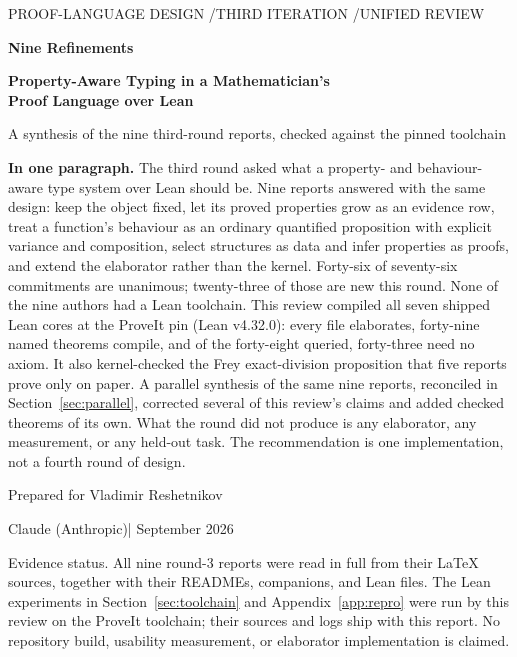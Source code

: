 \documentclass[11pt,a4paper]{article}
\theoremstyle{definition}
\begin{document}
\begin{titlepage}
\vspace*{8mm}
{\sffamily\small\color{muted}PROOF-LANGUAGE DESIGN \quad/\quad THIRD ITERATION \quad/\quad UNIFIED REVIEW\par}
\vspace{14mm}
{\sffamily\bfseries\color{ink}\fontsize{30}{36}\selectfont Nine Refinements\par}
\vspace{5mm}
{\sffamily\bfseries\color{ink}\fontsize{20}{25}\selectfont Property-Aware Typing in a Mathematician's\\Proof Language over Lean\par}
\vspace{8mm}
{\sffamily\large A synthesis of the nine third-round reports, checked against the pinned toolchain\par}
\vspace{12mm}
\begin{keybox}
\textbf{In one paragraph.} The third round asked what a property- and behaviour-aware type system over Lean should be. Nine reports answered with the same design: keep the object fixed, let its proved properties grow as an evidence row, treat a function's behaviour as an ordinary quantified proposition with explicit variance and composition, select structures as data and infer properties as proofs, and extend the elaborator rather than the kernel. Forty-six of seventy-six commitments are unanimous; twenty-three of those are new this round. None of the nine authors had a Lean toolchain. This review compiled all seven shipped Lean cores at the ProveIt pin (Lean v4.32.0): every file elaborates, forty-nine named theorems compile, and of the forty-eight queried, forty-three need no axiom. It also kernel-checked the Frey exact-division proposition that five reports prove only on paper. A parallel synthesis of the same nine reports, reconciled in Section~\ref{sec:parallel}, corrected several of this review's claims and added checked theorems of its own. What the round did not produce is any elaborator, any measurement, or any held-out task. The recommendation is one implementation, not a fourth round of design.
\end{keybox}
\vfill
{\sffamily Prepared for Vladimir Reshetnikov\par}
{\sffamily Claude (Anthropic)\quad| September 2026\par}
\vspace{4mm}
{\small\color{muted}Evidence status. All nine round-3 reports were read in full from their \LaTeX{} sources, together with their READMEs, companions, and Lean files. The Lean experiments in Section~\ref{sec:toolchain} and Appendix~\ref{app:repro} were run by this review on the ProveIt toolchain; their sources and logs ship with this report. No repository build, usability measurement, or elaborator implementation is claimed.\par}
\end{titlepage}
\end{document}
